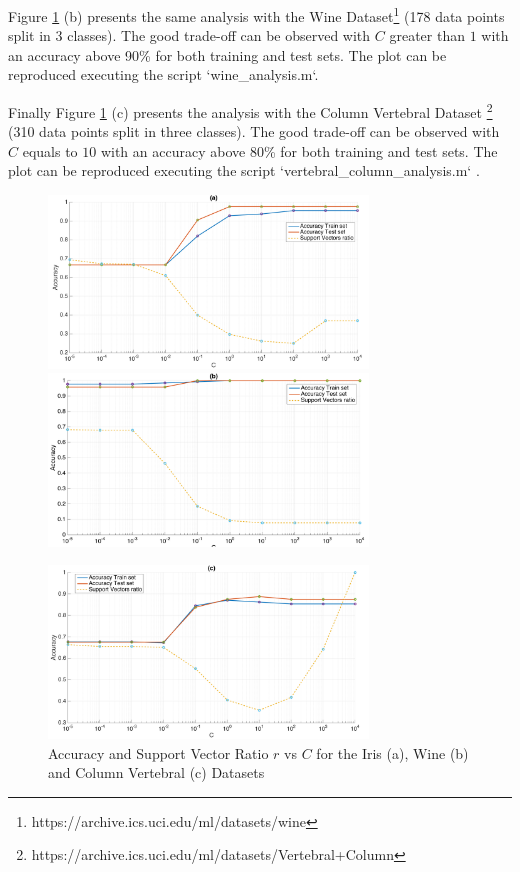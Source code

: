 Figure \ref{fig:datasets} (b) presents the same analysis with the Wine Dataset\footnote{https://archive.ics.uci.edu/ml/datasets/wine} (178 data points split in 3 classes).
The good trade-off can be observed with $C$ greater than $1$ with an accuracy above 90\% for both training and test sets.
The plot can be reproduced executing the script `wine\_analysis.m`.

Finally Figure \ref{fig:datasets} (c) presents the analysis with the Column Vertebral Dataset \footnote{https://archive.ics.uci.edu/ml/datasets/Vertebral+Column} (310 data points split in three classes).
The good trade-off can be observed with $C$ equals to $10$ with an accuracy above 80\% for both training and test sets.
The plot can be reproduced executing the script `vertebral\_column\_analysis.m` .

\begin{figure}[!htb]
\begin{center}
\includegraphics [width=8.5cm] {./graphics/iris.png}
\includegraphics [width=8.5cm] {./graphics/wine.png}

\includegraphics [width=8.5cm] {./graphics/vertebral_column.png}
\caption{Accuracy and Support Vector Ratio $r$ vs $C$ for the Iris (a), Wine (b) and Column Vertebral (c) Datasets} \label{fig:datasets}
\end{center}
\end{figure}